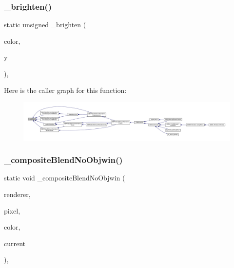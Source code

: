 \subsubsection{\texorpdfstring{\+\_\+brighten()}{\_brighten()}}
{\footnotesize\ttfamily static unsigned \+\_\+brighten (\begin{DoxyParamCaption}\item[{unsigned}]{color,  }\item[{\mbox{\hyperlink{ioapi_8h_a787fa3cf048117ba7123753c1e74fcd6}{int}}}]{y }\end{DoxyParamCaption})\hspace{0.3cm}{\ttfamily [inline]}, {\ttfamily [static]}}

Here is the caller graph for this function\+:
\nopagebreak
\begin{figure}[H]
\begin{center}
\leavevmode
\includegraphics[width=350pt]{software-private_8h_a7e90735a7e93c877a09e1975f18ca5c9_icgraph}
\end{center}
\end{figure}
\mbox{\label{software-private_8h_a7f6ac8624c7426eac5b84e727fd81ea6}} 
\subsubsection{\texorpdfstring{\+\_\+composite\+Blend\+No\+Objwin()}{\_compositeBlendNoObjwin()}}
{\footnotesize\ttfamily static void \+\_\+composite\+Blend\+No\+Objwin (\begin{DoxyParamCaption}\item[{struct G\+B\+A\+Video\+Software\+Renderer $\ast$}]{renderer,  }\item[{uint32\+\_\+t $\ast$}]{pixel,  }\item[{uint32\+\_\+t}]{color,  }\item[{uint32\+\_\+t}]{current }\end{DoxyParamCaption})\hspace{0.3cm}{\ttfamily [inline]}, {\ttfamily [static]}}

